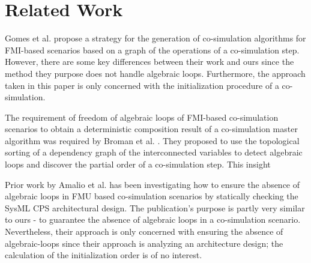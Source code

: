 \documentclass[runningheads]{llncs}
\begin{document}
\section{Related Work}
Gomes et al. \cite{Gomes2019} propose a strategy for the generation of co-simulation algorithms for FMI-based scenarios based on a graph of the operations of a co-simulation step. However, there are some key differences between their work and ours since the method they purpose does not handle algebraic loops. Furthermore, the approach taken in this paper is only concerned with the initialization procedure of a co-simulation.

The requirement of freedom of algebraic loops of FMI-based co-simulation scenarios to obtain a deterministic composition result of a co-simulation master algorithm was required by Broman et al. \cite{BromanCompositionCo-Simulation}. They proposed to use the topological sorting of a dependency graph of the interconnected variables to detect algebraic loops and discover the partial order of a co-simulation step. This insight 

Prior work by Amalio et al. \cite{Amalio2016CheckingCo-simulation} has been investigating how to ensure the absence of algebraic loops in FMU based co-simulation scenarios by statically checking the SysML CPS architectural design. The publication's purpose is partly very similar to ours - to guarantee the absence of algebraic loops in a co-simulation scenario. Nevertheless, their approach is only concerned with ensuring the absence of algebraic-loops since their approach is analyzing an architecture design; the calculation of the initialization order is of no interest.


%



\end{document}
